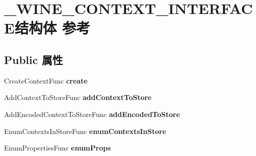 \hypertarget{struct___w_i_n_e___c_o_n_t_e_x_t___i_n_t_e_r_f_a_c_e}{}\section{\+\_\+\+W\+I\+N\+E\+\_\+\+C\+O\+N\+T\+E\+X\+T\+\_\+\+I\+N\+T\+E\+R\+F\+A\+C\+E结构体 参考}
\label{struct___w_i_n_e___c_o_n_t_e_x_t___i_n_t_e_r_f_a_c_e}
\subsection*{Public 属性}
\begin{DoxyCompactItemize}
\item 
\mbox{\label{struct___w_i_n_e___c_o_n_t_e_x_t___i_n_t_e_r_f_a_c_e_a05e023ec78bea61eae84948d5e463a13}} 
Create\+Context\+Func {\bfseries create}
\item 
\mbox{\label{struct___w_i_n_e___c_o_n_t_e_x_t___i_n_t_e_r_f_a_c_e_aba6ee749d700c40c9f4b6170877f826e}} 
Add\+Context\+To\+Store\+Func {\bfseries add\+Context\+To\+Store}
\item 
\mbox{\label{struct___w_i_n_e___c_o_n_t_e_x_t___i_n_t_e_r_f_a_c_e_a336d10c1c364fdaa7e18f8c18ae583b8}} 
Add\+Encoded\+Context\+To\+Store\+Func {\bfseries add\+Encoded\+To\+Store}
\item 
\mbox{\label{struct___w_i_n_e___c_o_n_t_e_x_t___i_n_t_e_r_f_a_c_e_abaaa1c4126b76629272425ac85184626}} 
Enum\+Contexts\+In\+Store\+Func {\bfseries enum\+Contexts\+In\+Store}
\item 
\mbox{\label{struct___w_i_n_e___c_o_n_t_e_x_t___i_n_t_e_r_f_a_c_e_a51478288d921a4853f18ba6e75441a85}} 
Enum\+Properties\+Func {\bfseries enum\+Props}
\item 
\mbox{\label{struct___w_i_n_e___c_o_n_t_e_x_t___i_n_t_e_r_f_a_c_e_a5f9fa02dccb33b5e59ce09c824f5d0e8}} 

\end{DoxyCompactItemize}
